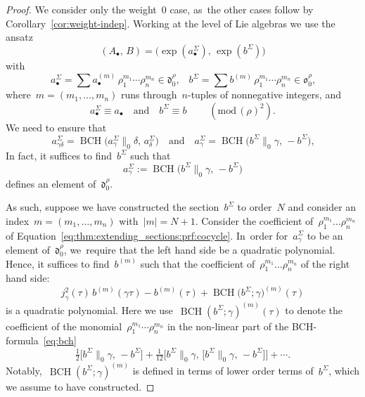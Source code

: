 \documentclass[10pt,a4paper]{article}
\numberwithin{equation}{section}
\let\oldbullet\bullet
\renewcommand{\bullet}{{\scriptscriptstyle\oldbullet}}
\theoremstyle{plain}
\theoremstyle{definition}
\newcommand{\tx}{\text}
\newcommand{\nbd}{\nobreakdash-\hspace{0pt}}
\newcommand{\frakd}{\ensuremath{\mathfrak{d}}}
\newcommand{\frako}{\ensuremath{\mathfrak{o}}}
\newcommand{\defeq}{:=}
\renewcommand{\pmod}[1]{\;(\mathrm{mod}\, #1)}
\let\ga\gamma
\DeclareMathOperator{\BCH}{BCH}
\begin{document}
\begin{proof}
We consider only the weight~$0$ case, as~the other cases follow by Corollary~\ref{cor:weight-indep}.
Working at the level of Lie algebras we use the ansatz
\begin{equation*}
(A_\bullet,\, B)
=
\bigl(
\exp(a^\Sigma_\bullet),\,
\exp(b^\Sigma)
\bigr)
\end{equation*}
with
\begin{equation*}
a^\Sigma_\bullet
=
\sum a^{(m)}_\bullet\, \rho_1^{m_1} \cdots \rho_n^{m_n}
\in
\frakd_0^\rho
\tx{,}\quad
b^\Sigma
=
\sum b^{(m)}\, \rho_1^{m_1} \cdots \rho_n^{m_n}
\in
\frako_0^\rho
\tx{,}
\end{equation*}
where~$m = (m_1,\ldots,m_n)$ runs through~$n$\nbd{}tuples of nonnegative integers, and
\begin{equation*}
a^\Sigma_\bullet
\equiv
a_\bullet
\quad\tx{and}\quad
b^\Sigma
\equiv
b
\qquad\pmod{(\rho)^2}
\tx{.}
\end{equation*}
We need to ensure that
\begin{equation*}
a^\Sigma_{\ga\delta} = \BCH\bigl(a^\Sigma_\ga\big\|_0\delta,\, a^\Sigma_\delta \bigr)
\quad\tx{and}\quad
a^\Sigma_\ga = \BCH\bigl(b^\Sigma\big\|_0\ga,\, -b^\Sigma \bigr)
\tx{,}
\end{equation*}
In fact, it suffices to find~$b^\Sigma$ such that
\begin{equation}
\label{eq:thm:extending_sections:prf:cocycle}
a^\Sigma_\ga
\defeq
\BCH\bigl(b^\Sigma\|_0\ga,\, -b^\Sigma \bigr)
\end{equation}
defines an element of~$\frakd_0^\rho$.

As such, suppose we have constructed the section~$b^\Sigma$ to order~$N$ and consider an index~$m=(m_1,\ldots,m_n)$ with~$|m|=N+1$. Consider the coefficient of~$\rho_1^{m_1}\ldots\rho_n^{m_n}$ of Equation~\eqref{eq:thm:extending_sections:prf:cocycle}. In~order for~$a^\Sigma_\ga$ to be an element of~$\frakd_0^\rho$, we~require that the left hand side be a quadratic polynomial. Hence, it suffices to find~$b^{(m)}$ such that the coefficient of~$\rho_1^{m_1}\ldots\rho_n^{m_n}$ of the right hand side:
\begin{equation}\label{eq:log-section-construction}
j_\ga^2(\tau)\,b^{(m)}(\ga\tau)
- b^{(m)}(\tau)
+ \BCH\bigl(b^\Sigma;\ga \bigr)^{(m)}(\tau)
\end{equation}
is a quadratic polynomial. Here we use~$\BCH(b^\Sigma;\ga)^{(m)}(\tau)$ to denote the coefficient of the monomial~$\rho_1^{m_1}\cdots\rho_n^{m_n}$ in the non-linear part of the BCH-formula~\eqref{eq:bch}
\begin{equation*}
\tfrac{1}{2}
\big[ b^\Sigma\big\|_0\ga,\, -b^\Sigma \big]
+ \tfrac{1}{12}
\Big[ b^\Sigma\big\|_0\ga,\, \big[b^\Sigma\big\|_0\ga,\, -b^\Sigma\big] \Big]
+ \cdots
\tx{.}
\end{equation*}
Notably,~$\BCH(b^\Sigma;\ga)^{(m)}$ is defined in terms of lower order terms of~$b^\Sigma$, which we assume to have constructed.


\end{proof}
\end{document}
